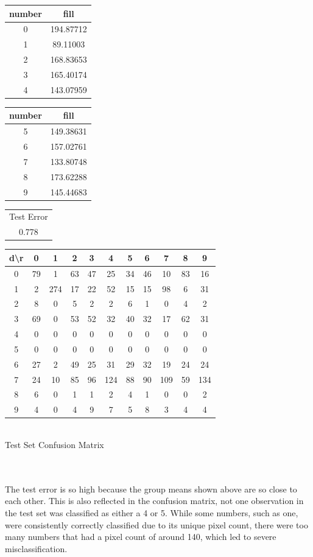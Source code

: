 \documentclass[10pt]{extarticle}
\begin{document}
\begin{minipage}{.45\textwidth}
\begin{center}
\begin{minipage}{.45\textwidth}
	\begin{tabular}{c c}
	number & fill\\ \hline
	0& 194.87712\\
	1&  89.11003\\
	2& 168.83653\\
	3& 165.40174\\
	4& 143.07959
	\end{tabular}
\end{minipage}
\begin{minipage}{.45\textwidth}
	\begin{tabular}{c c}
	number & fill\\ \hline
	5& 149.38631\\
	6& 157.02761\\
	7& 133.80748\\
	8& 173.62288\\
	9& 145.44683
	\end{tabular}
\end{minipage}
\begin{tabular}{c}
	Test Error\\
	0.778
\end{tabular}
\end{center}
\end{minipage}
\begin{minipage}{.6\textwidth}
	\begin{center}
	\begin{tabular}{c | c c c c c c c c c c}
	d\textbackslash r&0&1&2&3&4&5&6&7&8&9\\ \hline
	0&79&1&63&47&25&34&46&10&83&16\\
	1&2&274&17&22&52&15&15&98&6&31\\
	2&8&0&5&2&2&6&1&0&4&2\\
	3&69&0&53&52&32&40&32&17&62&31\\
	4&0&0&0&0&0&0&0&0&0&0\\
	5&0&0&0&0&0&0&0&0&0&0\\
	6&27&2&49&25&31&29&32&19&24&24\\
	7&24&10&85&96&124&88&90&109&59&134\\
	8&6&0&1&1&2&4&1&0&0&2\\
	9&4&0&4&9&7&5&8&3&4&4
	\end{tabular}\\
	\bigskip
	Test Set Confusion Matrix
	\end{center}
\end{minipage}\\\\
The test error is so high because the group means shown above are so close to each other. This is also reflected in the confusion matrix, not one observation in the test set was classified as either a 4 or 5. While some numbers, such as one, were consistently correctly classified due to its unique pixel count, there were too many numbers that had a pixel count of around 140, which led to severe misclassification.
\end{document}
